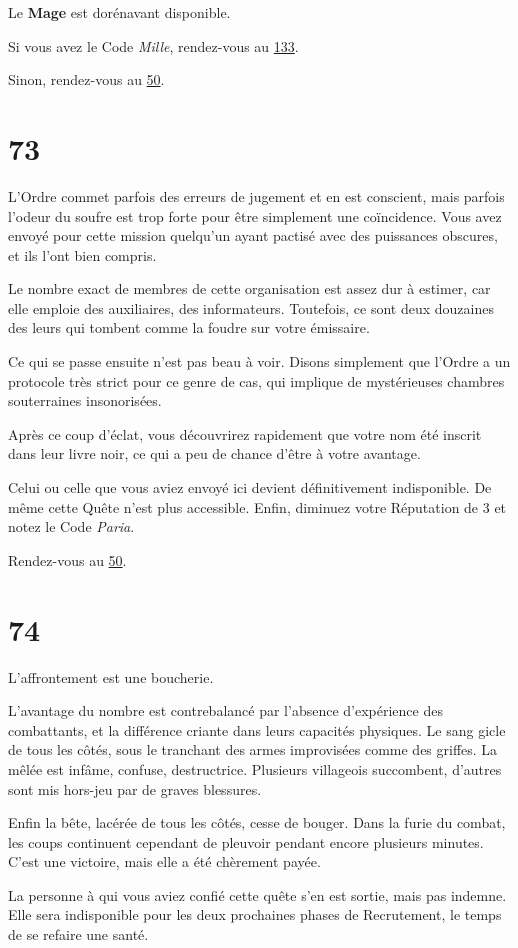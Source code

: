 \documentclass{report}
\newcommand{\gsection}[1]{
    \section{#1}
    \label{section-#1}
}
\newcommand{\glink}[1]{\hyperref[section-#1]{#1}}
\newcommand{\hero}[1]{\textbf{#1}}
\begin{document}
Le \hero{Mage} est dorénavant disponible.

Si vous avez le Code \emph{Mille}, rendez-vous au \glink{133}.

Sinon, rendez-vous au \glink{50}.

\gsection{73}

L'Ordre commet parfois des erreurs de jugement et en est conscient, mais parfois l'odeur du soufre est trop forte pour être simplement une coïncidence. Vous avez envoyé pour cette mission quelqu'un ayant pactisé avec des puissances obscures, et ils l'ont bien compris.

Le nombre exact de membres de cette organisation est assez dur à estimer, car elle emploie des auxiliaires, des informateurs. Toutefois, ce sont deux douzaines des leurs qui tombent comme la foudre sur votre émissaire.

Ce qui se passe ensuite n'est pas beau à voir. Disons simplement que l'Ordre a un protocole très strict pour ce genre de cas, qui implique de mystérieuses chambres souterraines insonorisées.

Après ce coup d'éclat, vous découvrirez rapidement que votre nom été inscrit dans leur livre noir, ce qui a peu de chance d'être à votre avantage.

Celui ou celle que vous aviez envoyé ici devient définitivement indisponible. De même cette Quête n'est plus accessible. Enfin, diminuez votre Réputation de 3 et notez le Code \emph{Paria}.

Rendez-vous au \glink{50}.

\gsection{74}

L'affrontement est une boucherie.

L'avantage du nombre est contrebalancé par l'absence d'expérience des combattants, et la différence criante dans leurs capacités physiques. Le sang gicle de tous les côtés, sous le tranchant des armes improvisées comme des griffes. La mêlée est infâme, confuse, destructrice. Plusieurs villageois succombent, d'autres sont mis hors-jeu par de graves blessures.

Enfin la bête, lacérée de tous les côtés, cesse de bouger. Dans la furie du combat, les coups continuent cependant de pleuvoir pendant encore plusieurs minutes. C'est une victoire, mais elle a été chèrement payée. 

La personne à qui vous aviez confié cette quête s'en est sortie, mais pas indemne. Elle sera indisponible pour les deux prochaines phases de Recrutement, le temps de se refaire une santé.
\end{document}
